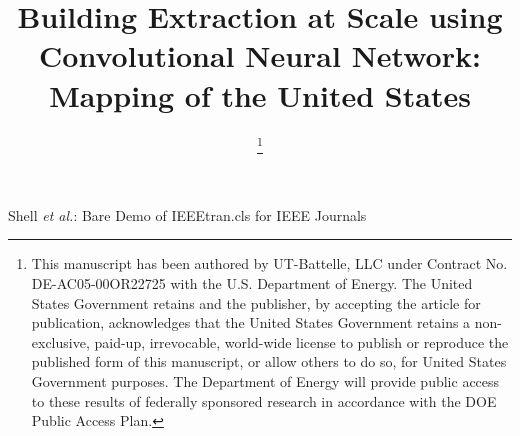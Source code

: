 \documentclass[journal]{IEEEtran}
\begin{document}
\title{Building Extraction at Scale using Convolutional Neural Network: Mapping of the United States}
\author{%

\thanks{This manuscript has been authored by UT-Battelle, LLC under Contract No. DE-AC05-00OR22725 with the U.S. Department of Energy. The United States Government retains and the publisher, by accepting the article for publication, acknowledges that the United States Government retains a non-exclusive, paid-up, irrevocable, world-wide license to publish or reproduce the published form of this manuscript, or allow others to do so, for United States Government purposes. The Department of Energy will provide public access to these results of federally sponsored research in accordance with the DOE Public Access Plan.}

}



%
{Shell \MakeLowercase{\textit{et al.}}: Bare Demo of IEEEtran.cls for IEEE Journals}











\maketitle
\end{document}
